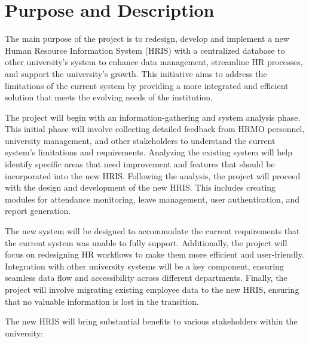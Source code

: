 \section{Purpose and Description}

    The main purpose of the project is to redesign, develop and implement a new Human Resource Information System (HRIS) with a centralized database to other university's system to enhance data management, streamline HR processes, and support the university's growth. This initiative aims to address the limitations of the current system by providing a more integrated and efficient solution that meets the evolving needs of the institution.

    The project will begin with an information-gathering and system analysis phase. This initial phase will involve collecting detailed feedback from HRMO personnel, university management, and other stakeholders to understand the current system's limitations and requirements. Analyzing the existing system will help identify specific areas that need improvement and features that should be incorporated into the new HRIS. Following the analysis, the project will proceed with the design and development of the new HRIS. This includes creating modules for attendance monitoring, leave management, user authentication, and report generation. 
    
    The new system will be designed to accommodate the current requirements that the current system was unable to fully support. Additionally, the project will focus on redesigning HR workflows to make them more efficient and user-friendly. Integration with other university systems will be a key component, ensuring seamless data flow and accessibility across different departments. Finally, the project will involve migrating existing employee data to the new HRIS, ensuring that no valuable information is lost in the transition.

    The new HRIS will bring substantial benefits to various stakeholders within the university:
    
